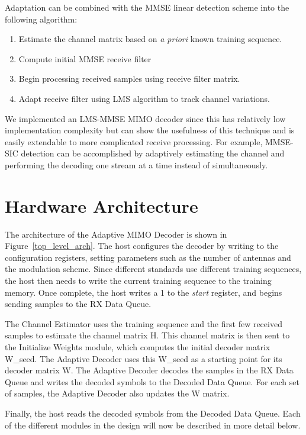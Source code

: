 \documentclass[journal]{IEEEtran}
\begin{document}
Adaptation can be combined with the  MMSE linear detection scheme into the following algorithm:
\begin{enumerate}
\item Estimate the channel matrix based on {\em a priori} known training sequence.
\item Compute initial MMSE receive filter
\item Begin processing received samples using receive filter matrix.
\item Adapt receive filter using LMS algorithm to track channel variations.
\end{enumerate}

We implemented an LMS-MMSE MIMO decoder since this has relatively low implementation complexity but can show the usefulness of this technique and is easily extendable to more complicated receive processing. For example, MMSE-SIC detection can be accomplished by adaptively estimating the channel and performing the decoding one stream at a time instead of simultaneously. 

\section{Hardware Architecture}

The architecture of the Adaptive MIMO Decoder is shown in Figure~\ref{top_level_arch}. The host configures the decoder by writing to the configuration registers, setting parameters such as the number of antennas and the modulation scheme. Since different standards use different training sequences, the host then needs to write the current training sequence to the training memory. Once complete, the host writes a 1 to the {\em start} register, and begins sending samples to the RX Data Queue.

The Channel Estimator uses the training sequence and the first few received samples to estimate the channel matrix H. This channel matrix is then sent to the Initialize Weights module, which computes the initial decoder matrix W\_seed. The Adaptive Decoder uses this W\_seed as a starting point for its decoder matrix W. The Adaptive Decoder decodes the samples in the RX Data Queue and writes the decoded symbols to the Decoded Data Queue. For each set of samples, the Adaptive Decoder also updates the W matrix.

Finally, the host reads the decoded symbols from the Decoded Data Queue. Each of the different modules in the design will now be described in more detail below.
\end{document}
